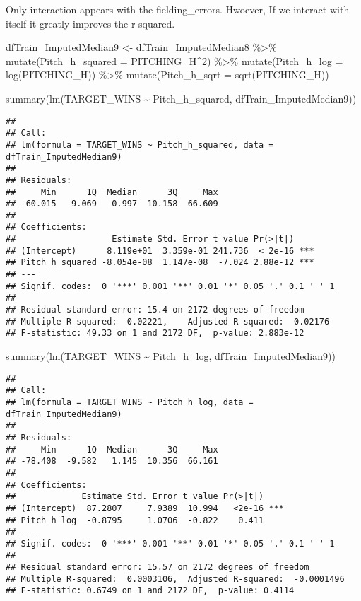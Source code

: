\documentclass[
]{article}
\newenvironment{Shaded}{\begin{snugshade}}{\end{snugshade}}
\newcommand{\AttributeTok}[1]{\textcolor[rgb]{0.77,0.63,0.00}{#1}}
\newcommand{\DecValTok}[1]{\textcolor[rgb]{0.00,0.00,0.81}{#1}}
\newcommand{\FunctionTok}[1]{\textcolor[rgb]{0.00,0.00,0.00}{#1}}
\newcommand{\NormalTok}[1]{#1}
\newcommand{\OtherTok}[1]{\textcolor[rgb]{0.56,0.35,0.01}{#1}}
\newcommand{\SpecialCharTok}[1]{\textcolor[rgb]{0.00,0.00,0.00}{#1}}
\begin{document}
Only interaction appears with the fielding\_errors. Hwoever, If we
interact with itself it greatly improves the r squared.

\begin{Shaded}
\begin{Highlighting}[]
\NormalTok{dfTrain\_ImputedMedian9 }\OtherTok{\textless{}{-}}\NormalTok{ dfTrain\_ImputedMedian8 }\SpecialCharTok{\%\textgreater{}\%}
  \FunctionTok{mutate}\NormalTok{(}\AttributeTok{Pitch\_h\_squared =}\NormalTok{ PITCHING\_H}\SpecialCharTok{\^{}}\DecValTok{2}\NormalTok{) }\SpecialCharTok{\%\textgreater{}\%}
    \FunctionTok{mutate}\NormalTok{(}\AttributeTok{Pitch\_h\_log =} \FunctionTok{log}\NormalTok{(PITCHING\_H)) }\SpecialCharTok{\%\textgreater{}\%}
    \FunctionTok{mutate}\NormalTok{(}\AttributeTok{Pitch\_h\_sqrt =} \FunctionTok{sqrt}\NormalTok{(PITCHING\_H))}

\FunctionTok{summary}\NormalTok{(}\FunctionTok{lm}\NormalTok{(TARGET\_WINS }\SpecialCharTok{\textasciitilde{}}\NormalTok{ Pitch\_h\_squared, dfTrain\_ImputedMedian9))}
\end{Highlighting}
\end{Shaded}

\begin{verbatim}
## 
## Call:
## lm(formula = TARGET_WINS ~ Pitch_h_squared, data = dfTrain_ImputedMedian9)
## 
## Residuals:
##     Min      1Q  Median      3Q     Max 
## -60.015  -9.069   0.997  10.158  66.609 
## 
## Coefficients:
##                   Estimate Std. Error t value Pr(>|t|)    
## (Intercept)      8.119e+01  3.359e-01 241.736  < 2e-16 ***
## Pitch_h_squared -8.054e-08  1.147e-08  -7.024 2.88e-12 ***
## ---
## Signif. codes:  0 '***' 0.001 '**' 0.01 '*' 0.05 '.' 0.1 ' ' 1
## 
## Residual standard error: 15.4 on 2172 degrees of freedom
## Multiple R-squared:  0.02221,    Adjusted R-squared:  0.02176 
## F-statistic: 49.33 on 1 and 2172 DF,  p-value: 2.883e-12
\end{verbatim}

\begin{Shaded}
\begin{Highlighting}[]
\FunctionTok{summary}\NormalTok{(}\FunctionTok{lm}\NormalTok{(TARGET\_WINS }\SpecialCharTok{\textasciitilde{}}\NormalTok{ Pitch\_h\_log, dfTrain\_ImputedMedian9))}
\end{Highlighting}
\end{Shaded}

\begin{verbatim}
## 
## Call:
## lm(formula = TARGET_WINS ~ Pitch_h_log, data = dfTrain_ImputedMedian9)
## 
## Residuals:
##     Min      1Q  Median      3Q     Max 
## -78.408  -9.582   1.145  10.356  66.161 
## 
## Coefficients:
##             Estimate Std. Error t value Pr(>|t|)    
## (Intercept)  87.2807     7.9389  10.994   <2e-16 ***
## Pitch_h_log  -0.8795     1.0706  -0.822    0.411    
## ---
## Signif. codes:  0 '***' 0.001 '**' 0.01 '*' 0.05 '.' 0.1 ' ' 1
## 
## Residual standard error: 15.57 on 2172 degrees of freedom
## Multiple R-squared:  0.0003106,  Adjusted R-squared:  -0.0001496 
## F-statistic: 0.6749 on 1 and 2172 DF,  p-value: 0.4114
\end{verbatim}
\end{document}
